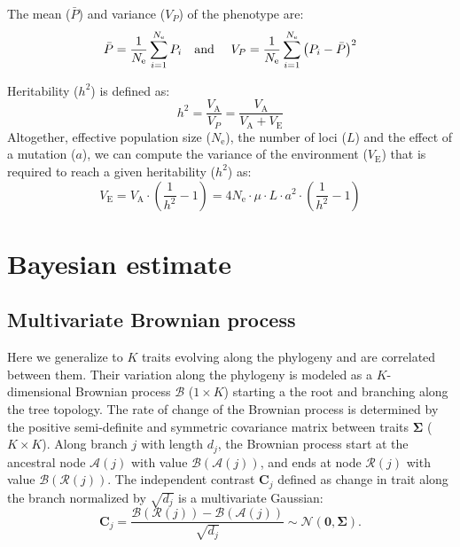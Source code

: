 \documentclass{article}
\newcommand{\Multiply}{\cdot}
\newcommand{\UniDimArray}[1]{\bm{#1}}
\newcommand{\BiDimArray}[1]{\bm{#1}}
\newcommand{\Ne}{N_{\text{e}}}
\newcommand{\Trait}{P}
\newcommand{\Heritability}{h^2}
\newcommand{\VecZero}{\UniDimArray{0}}
\newcommand{\MutationRate}{\mu}
\newcommand{\NbrLoci}{L}
\newcommand{\VarPhenotype}{V_{\Trait}}
\newcommand{\VarGenetic}{V_{\mathrm{A}}}
\newcommand{\VarEnv}{V_{\mathrm{E}}}
\newcommand{\Ntrait}{K}
\newcommand{\contrast}{\UniDimArray{C}}
\newcommand{\Covariancematrix}{\Sigma}
\newcommand{\CovarianceMatrix}{\BiDimArray{\Covariancematrix}}
\newcommand{\brownian}{\mathcal{B}}
\newcommand{\Brownian}{\UniDimArray{\brownian}}
\begin{document}
The mean ($\bar{\Trait}$) and variance ($\VarPhenotype$) of the phenotype are:
\begin{equation}
    \bar{\Trait} = \frac{1}{\Ne}\sum_{i=1}^{\Ne} \Trait_i \text{\quad and \quad} \VarPhenotype = \frac{1}{\Ne}\sum_{i=1}^{\Ne}\left(\Trait_i - \bar{\Trait} \right)^2 \label{eq:simu-between}
\end{equation}

Heritability ($\Heritability$) is defined as:
\begin{equation}
    \Heritability = \frac{\VarGenetic}{\VarPhenotype} = \frac{\VarGenetic}{\VarGenetic + \VarEnv}\label{eq:simu-heritability}
\end{equation}
Altogether, effective population size ($\Ne$), the number of loci ($\NbrLoci$) and the effect of a mutation ($a$), we can compute the variance of the environment ($\VarEnv$) that is required to reach a given heritability ($\Heritability$) as:
\begin{equation}
    \VarEnv = \VarGenetic \Multiply \left( \frac{1}{\Heritability} - 1 \right) = 4 \Ne \Multiply \MutationRate \Multiply \NbrLoci \Multiply a^2 \Multiply \left( \frac{1}{\Heritability} - 1 \right) \label{eq:simu-var-env}
\end{equation}

\newpage
\section{Bayesian estimate}\label{sec:bayesian-estimate}

\subsection{Multivariate Brownian process}\label{subsec:multivariate-brownian-process}
Here we generalize to $\Ntrait$ traits evolving along the phylogeny and are correlated between them.
Their variation along the phylogeny is modeled as a $\Ntrait$-dimensional Brownian process $\Brownian$ ($1 \times \Ntrait$) starting a the root and branching along the tree topology.
The rate of change of the Brownian process is determined by the positive semi-definite and symmetric covariance matrix between traits $\CovarianceMatrix$ ($\Ntrait \times \Ntrait$).
Along branch $j$ with length $d_{j}$, the Brownian process start at the ancestral node $\mathcal{A}(j)$ with value $\Brownian(\mathcal{A}(j))$, and ends at node $\mathcal{R}(j)$  with value $\Brownian(\mathcal{R}(j))$.
The independent contrast $\contrast_{j}$ defined as change in trait along the branch normalized by $\sqrt {d_{j}}$ is a multivariate Gaussian:
\begin{equation}
    \label{eq:DistribBrownian}
    \contrast_{j} = \frac{\Brownian (\mathcal{R}(j)) - \Brownian (\mathcal{A}(j)) }{\sqrt {d_{j}}} \sim \mathcal{N}\left(\VecZero, \CovarianceMatrix \right).
\end{equation}
\end{document}
